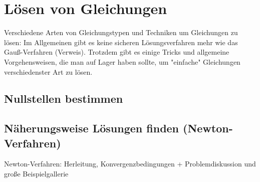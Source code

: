 \chapter{Lösen von Gleichungen}
Verschiedene Arten von Gleichungstypen und Techniken um Gleichungen zu lösen: Im Allgemeinen gibt es keine sicheren Lösungsverfahren mehr wie das Gauß-Verfahren (Verweis). Trotzdem gibt es einige Tricks und allgemeine Vorgehensweisen, die man auf Lager haben sollte, um "einfache" Gleichungen verschiedenster Art zu lösen. 

\section{Nullstellen bestimmen}

\section{Näherungsweise Lösungen finden (Newton-Verfahren)}
Newton-Verfahren: Herleitung, Konvergenzbedingungen + Problemdiskussion und große Beispielgallerie